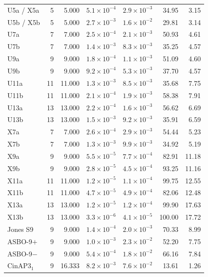 \documentclass[10pt,aps,twocolumn,pra,floatfix,superscriptaddress]{revtex4-2}
\begin{document}
\begin{table}[tp]
\begin{ruledtabular}
\begin{tabular}{lrrrrrr}
U5a / X5a & 5 & 5.000 & $5.1\times10^{-4}$ & $2.9\times10^{-3}$ & 34.95 & 3.15 \\
U5b / X5b & 5 & 5.000 & $2.7\times10^{-3}$ & $1.6\times10^{-2}$ & 29.81 & 3.14 \\
U7a & 7 & 7.000 & $2.5\times10^{-4}$ & $2.1\times10^{-3}$ & 50.93 & 4.61 \\
U7b & 7 & 7.000 & $1.4\times10^{-3}$ & $8.3\times10^{-3}$ & 35.25 & 4.57 \\
U9a & 9 & 9.000 & $1.8\times10^{-4}$ & $1.1\times10^{-3}$ & 51.09 & 4.60 \\
U9b & 9 & 9.000 & $9.2\times10^{-4}$ & $5.3\times10^{-3}$ & 37.70 & 4.57 \\
U11a & 11 & 11.000 & $1.3\times10^{-3}$ & $8.5\times10^{-3}$ & 35.68 & 7.75 \\
U11b & 11 & 11.000 & $2.1\times10^{-4}$ & $1.9\times10^{-3}$ & 58.38 & 7.91 \\
U13a & 13 & 13.000 & $2.2\times10^{-4}$ & $1.6\times10^{-3}$ & 56.62 & 6.69 \\
U13b & 13 & 13.000 & $1.5\times10^{-3}$ & $9.2\times10^{-3}$ & 35.91 & 6.59 \\
X7a & 7 & 7.000 & $2.6\times10^{-4}$ & $2.9\times10^{-3}$ & 54.44 & 5.23 \\
X7b & 7 & 7.000 & $1.3\times10^{-3}$ & $9.9\times10^{-3}$ & 34.92 & 5.19 \\
X9a & 9 & 9.000 & $5.5\times10^{-5}$ & $7.7\times10^{-4}$ & 82.91 & 11.18 \\
X9b & 9 & 9.000 & $2.8\times10^{-5}$ & $4.5\times10^{-4}$ & 93.25 & 11.16 \\
X11a & 11 & 11.000 & $1.2\times10^{-5}$ & $1.1\times10^{-4}$ & 99.75 & 12.55 \\
X11b & 11 & 11.000 & $4.7\times10^{-5}$ & $4.9\times10^{-4}$ & 82.06 & 12.48 \\
X13a & 13 & 13.000 & $1.2\times10^{-5}$ & $1.2\times10^{-4}$ & 99.90 & 17.63 \\
X13b & 13 & 13.000 & $3.3\times10^{-6}$ & $4.1\times10^{-5}$ & 100.00 & 17.72 \\
Jones S9 & 9 & 9.000 & $1.4\times10^{-4}$ & $2.0\times10^{-3}$ & 70.33 & 8.99 \\
ASBO-9$+$ & 9 & 9.000 & $1.0\times10^{-3}$ & $2.3\times10^{-2}$ & 52.20 & 7.75 \\
ASBO-9$-$ & 9 & 9.000 & $5.4\times10^{-4}$ & $1.8\times10^{-2}$ & 66.16 & 7.84 \\
$\mathrm{CinAP3}_{1}$ & 9 & 16.333 & $8.2\times10^{-3}$ & $7.6\times10^{-2}$ & 13.61 & 1.26 \\

\end{tabular}
\end{ruledtabular}
\end{table}
\end{document}
